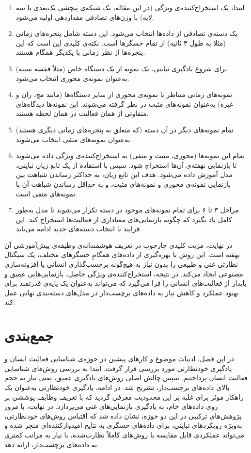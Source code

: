 \begin{enumerate}
\item ابتدا، یک استخراج‌کننده‌ی ویژگی (در این مقاله، یک شبکه‌ی پیچشی یک‌بعدی با سه لایه) با وزن‌های تصادفی مقداردهی اولیه می‌شود.
\item یک دسته‌ی تصادفی از داده‌ها انتخاب می‌شود. این دسته شامل پنجره‌های زمانی (مثلا به طول ۳ ثانیه) از تمام حسگرها است. نکته‌ی کلیدی این است که این پنجره‌ها از نظر زمانی با یکدیگر همگام هستند.
\item برای شروع یادگیری تباینی، یک نمونه از یک دستگاه خاص (مثلاً قفسه سینه) به‌عنوان نمونه‌ی محوری  انتخاب می‌شود.
\item نمونه‌های زمانی متناظر با نمونه‌ی محوری از سایر دستگاه‌ها (مانند مچ، ران و غیره) به‌عنوان نمونه‌های مثبت در نظر گرفته می‌شوند. این نمونه‌ها دیدگاه‌های متفاوتی از همان فعالیت در همان لحظه هستند.
\item تمام نمونه‌های دیگر در آن دسته (که متعلق به پنجره‌های زمانی دیگری هستند) به‌عنوان نمونه‌های منفی انتخاب می‌شوند.
\item تمام این نمونه‌ها (محوری، مثبت و منفی) به استخراج‌کننده‌ی ویژگی داده می‌شوند تا بازنمایی نهفته‌ی آن‌ها استخراج شود. سپس با استفاده از یک تابع زیان تباینی، مدل آموزش داده می‌شود. هدف این تابع زیان، به حداکثر رساندن شباهت بین بازنمایی نمونه‌ی محوری و نمونه‌های مثبت، و به حداقل رساندن شباهت آن با نمونه‌های منفی است.
\item مراحل ۳ تا ۶ برای تمام نمونه‌های موجود در دسته تکرار می‌شوند تا مدل به‌طور کامل یاد بگیرد که چگونه بازنمایی‌های معناداری از فعالیت‌ها استخراج کند. این فرایند با انتخاب دسته‌های جدید ادامه می‌یابد.
\end{enumerate}

در نهایت، مزیت کلیدی چارچوب  در تعریف هوشمندانه‌ی وظیفه‌ی پیش‌آموزشی آن نهفته است. این روش با بهره‌گیری از داده‌های همگامِ حسگرهای مختلف، یک سیگنال نظارتی غنی و طبیعی را بدون نیاز به هیچ‌گونه برچسب‌گذاری انسانی یا افزونه‌سازی مصنوعی ایجاد می‌کند. در نتیجه، استخراج‌کننده‌ی ویژگی حاصل، بازنمایی‌هایی عمیق و پایدار از فعالیت‌های انسانی را فرا می‌گیرد که می‌تواند به‌عنوان یک پایه‌ی قدرتمند برای بهبود عملکرد و کاهش نیاز به داده‌های برچسب‌دار در مدل‌های دسته‌بندی نهایی عمل کند.

\section{جمع‌بندی}

در این فصل، ادبیات موضوع و کارهای پیشین در حوزه‌ی شناسایی فعالیت انسان و یادگیری خودنظارتی مورد بررسی قرار گرفت. ابتدا به بررسی روش‌های شناسایی فعالیت انسان پرداختیم. سپس چالش اصلی روش‌های یادگیری عمیق، یعنی نیاز به حجم بالای داده‌های برچسب‌دار، تشریح شد. در ادامه، یادگیری خودنظارتی به‌عنوان یک راهکار موثر برای غلبه بر این محدودیت معرفی گردید که با تعریف وظایف پوششی بر روی داده‌های خام، به یادگیری بازنمایی‌های غنی می‌پردازد. در نهایت، با مرور پژوهش‌های ترکیبی در این دو حوزه، نشان داده شد که اقتباس روش‌های خودنظارتی، به‌ویژه رویکردهای تباینی، برای داده‌های حسگری به نتایج امیدوارکننده‌ای منجر شده و می‌تواند عملکردی قابل مقایسه با روش‌های کاملاً نظارت‌شده، با نیاز به مراتب کمتری به داده‌های برچسب‌دار، ارائه دهد.
